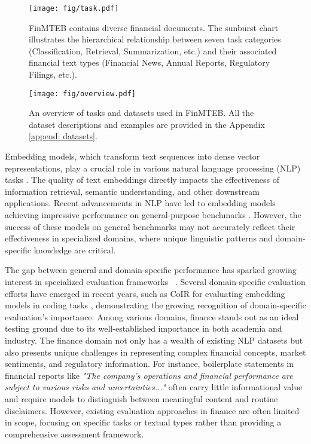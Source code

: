 \begin{figure}
    \centering
    \texttt{[image: fig/task.pdf]}
    \caption{FinMTEB contains diverse financial documents. The sunburst chart illustrates the hierarchical relationship between seven task categories (Classification, Retrieval, Summarization, etc.) and their associated financial text types (Financial News, Annual Reports, Regulatory Filings, etc.).}
    \label{fig:enter-label}
\end{figure}


\begin{figure*}
    \centering
    \texttt{[image: fig/overview.pdf]}
    \caption{An overview of tasks and datasets used in FinMTEB. All the dataset descriptions and examples are provided in the Appendix \ref{append: datasets}. }
    \label{fig: overview}
\end{figure*}
Embedding models, which transform text sequences into dense vector representations, play a crucial role in various natural language processing (NLP) tasks \citep{word2vector, pennington-etal-2014-glove, peters-etal-2018-deep}. The quality of text embeddings directly impacts the effectiveness of information retrieval, semantic understanding, and other downstream applications. Recent advancements in NLP have led to embedding models achieving impressive performance on general-purpose benchmarks \citep{e5,gte,SFR-embedding-2}. However, the success of these models on general benchmarks may not accurately reflect their effectiveness in specialized domains, where unique linguistic patterns and domain-specific knowledge are critical.

The gap between general and domain-specific performance has sparked growing interest in specialized evaluation frameworks ~\citep{gururangan-etal-2020-dont,domainiskey}. Several domain-specific evaluation efforts have emerged in recent years, such as CoIR for evaluating embedding models in coding tasks \citep{li2024coir}, demonstrating the growing recognition of domain-specific evaluation's importance. Among various domains, finance stands out as an ideal testing ground due to its well-established importance in both academia and industry. The finance domain not only has a wealth of existing NLP datasets \citep{FiQA,financebench,finsts} but also presents unique challenges in representing complex financial concepts, market sentiments, and regulatory information. For instance, boilerplate statements in financial reports like \textit{"The company's operations and financial performance are subject to various risks and uncertainties..."} often carry little informational value and require models to distinguish between meaningful content and routine disclaimers. However, existing evaluation approaches in finance are often limited in scope, focusing on specific tasks or textual types rather than providing a comprehensive assessment framework.


